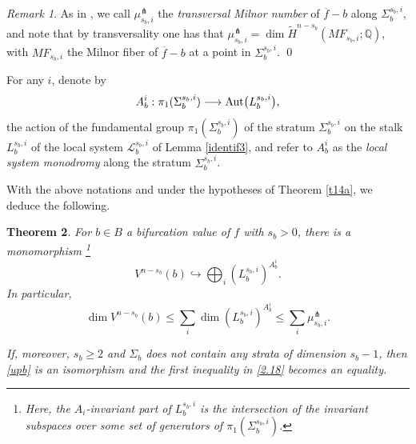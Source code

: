 \documentclass[12pt,leqno,twoside]{amsart}
\newtheorem{theorem}{Theorem}[section]
\theoremstyle{remark}
\newtheorem{remark}[theorem]{\sc Remark}
\theoremstyle{remark}
\theoremstyle{definition}
\theoremstyle{remark}
\theoremstyle{remark}
\theoremstyle{remark}
\numberwithin{equation}{section}  %
\def\be{\begin{equation}}
\def\ee{\end{equation}}
\def\bt{\begin{theorem}}
\def\et{\end{theorem}}
\newcommand{\lra}{\longrightarrow}
\newcommand{\bQ}{\mathbb{Q}}
\newcommand{\of}{\overline{f}}
\begin{document}
\begin{remark}\label{tmn}
As in \cite{MPT2}, we call $\mu^\pitchfork_{s_b,i}$ the {\it transversal Milnor number} of $\of-b$ along $\Sigma_b^{s_b,i}$, and
note that by transversality one has that $\mu^\pitchfork_{s_b,i}=\dim \widetilde{H}^{n-s_b}(MF_{s_b,i};\bQ)$,
with $MF_{s_b,i}$ the Milnor fiber of $\of-b$ at a point in $\Sigma_b^{s_b,i}$. \hfill\qed
\end{remark}





For any $i$, denote by
\be\label{vm}
 A_b^i:\pi_1(\Sigma_b^{s_b,i}) \lra {\rm Aut}\big({L}_b^{s_b,i}\big),
 \ee
the action of the fundamental group $\pi_1(\Sigma_b^{s_b,i})$ of the stratum $\Sigma_b^{s_b,i}$ on the stalk ${L}_b^{s_b,i}$ of the local system $\mathcal{L}_b^{s_b,i}$ of Lemma \ref{identif3}, and refer to $A_b^i$ as the {\it local system monodromy} along the stratum $\Sigma_b^{s_b,i}$.

With the above notations and under the hypotheses of Theorem \ref{t14a}, we deduce the following.

\bt\label{c14a}
For $b \in B$ a bifurcation value of $f$ with $s_b>0$, there is a monomorphism  \footnote{Here, the $A_i$-invariant part of ${L}_b^{s_b,i}$ is the intersection of the invariant subspaces over some set of generators of $\pi_1(\Sigma_b^{s_b,i})$.}
\be\label{upb}
V^{n-s_b}(b) \hookrightarrow \bigoplus_i \left({L}_b^{s_b,i}\right)^{A_b^i}.
\ee
In particular, 
 \be\label{2.18}
\dim V^{n-s_b}(b) \leq \sum_i \dim \left({L}_b^{s_b,i}\right)^{A_b^i} \leq \sum_i  \mu^\pitchfork_{s_b,i}.
 \ee
 
  If, moreover, $s_b \geq 2$ and $\Sigma_b$ does not contain any strata of dimension $s_b-1$, then \eqref{upb} is an isomorphism and  the first inequality in \eqref{2.18} becomes an equality. 
\et
\end{document}
